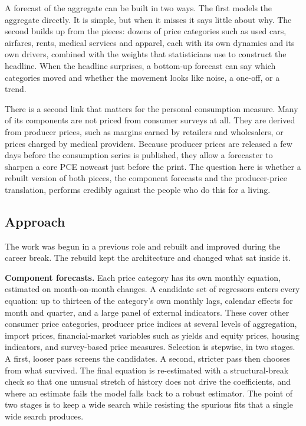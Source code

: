 \documentclass[
  british,
  a4paper,
]{article}
\begin{document}
A forecast of the aggregate can be built in two ways. The first models
the aggregate directly. It is simple, but when it misses it says little
about why. The second builds up from the pieces: dozens of price
categories such as used cars, airfares, rents, medical services and
apparel, each with its own dynamics and its own drivers, combined with
the weights that statisticians use to construct the headline. When the
headline surprises, a bottom-up forecast can say which categories moved
and whether the movement looks like noise, a one-off, or a trend.

There is a second link that matters for the personal consumption
measure. Many of its components are not priced from consumer surveys at
all. They are derived from producer prices, such as margins earned by
retailers and wholesalers, or prices charged by medical providers.
Because producer prices are released a few days before the consumption
series is published, they allow a forecaster to sharpen a core PCE
nowcast just before the print. The question here is whether a rebuilt
version of both pieces, the component forecasts and the producer-price
translation, performs credibly against the people who do this for a
living.

\subsection{Approach}\label{approach}

The work was begun in a previous role and rebuilt and improved during
the career break. The rebuild kept the architecture and changed what sat
inside it.

\textbf{Component forecasts.} Each price category has its own monthly
equation, estimated on month-on-month changes. A candidate set of
regressors enters every equation: up to thirteen of the category's own
monthly lags, calendar effects for month and quarter, and a large panel
of external indicators. These cover other consumer price categories,
producer price indices at several levels of aggregation, import prices,
financial-market variables such as yields and equity prices, housing
indicators, and survey-based price measures. Selection is stepwise, in
two stages. A first, looser pass screens the candidates. A second,
stricter pass then chooses from what survived. The final equation is
re-estimated with a structural-break check so that one unusual stretch
of history does not drive the coefficients, and where an estimate fails
the model falls back to a robust estimator. The point of two stages is
to keep a wide search while resisting the spurious fits that a single
wide search produces.
\end{document}
